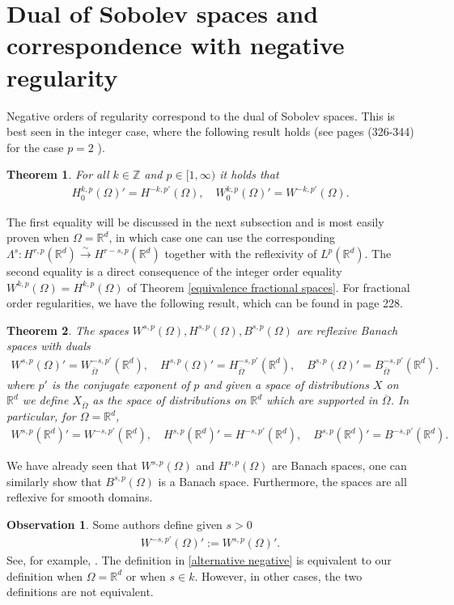 \documentclass[
    a4paper,
    DIV=14,
    abstract=true,
    numbers=noenddot
]
{scrartcl}
\newtheorem{theorem}{Theorem}[section]
\theoremstyle{definition}
\newtheorem{observation}{Observation}
\newcommand{\iso}{\xrightarrow{\sim}}
\newcommand{\R}{\mathbb{R}}
\begin{document}
\section{Dual of Sobolev spaces and correspondence with negative regularity}
Negative orders of regularity correspond to the dual of Sobolev spaces. This is best seen in the integer case, where the following result holds (see \cite{evans2022partial} pages (326-344) for the case $p=2$ ).
\begin{theorem}\label{dual of integer sobolev}
    For all $k \in \mathbb{Z}$ and $p \in [1,\infty)$ it holds that
    \begin{align*}
        H^{k,p}_0(\Omega )' = H^{-k,p'}(\Omega ), \quad W^{k,p}_0(\Omega )' = W^{-k,p'}(\Omega ).
    \end{align*}
\end{theorem}
The first equality will be discussed in the next subsection and is most easily proven when $\Omega =\R^d$, in which case one can use the corresponding $\Lambda ^s: H^{r,p}(\R^d )\iso H^{r-s,p}(\R^d )$ together with the reflexivity of $L^p(\R^d )$. The second equality is a direct consequence of the integer order equality $W^{k,p}(\Omega )=H^{k,p}(\Omega )$ of Theorem \ref{equivalence fractional spaces}. For fractional order regularities, we have the following result, which can be found in \cite{agranovich2015sobolev} page 228.
\begin{theorem}
    The spaces $W^{s,p}(\Omega ),H^{s,p}(\Omega ),B^{s,p}(\Omega )$ are reflexive Banach spaces with duals
    \begin{align*}
        W^{s,p}(\Omega )'=	W^{-s,p'}_{\overline{\Omega } }(\R^d ), \quad H^{s,p}(\Omega )' = H^{-s,p'}_{\overline{\Omega } }(\R^d ), \quad B^{s,p}(\Omega )' = B^{-s,p'}_{\overline{\Omega } }(\R^d ).
    \end{align*}
    where $p'$ is the conjugate exponent of $p$ and given a space of distributions $X$ on $\R^d$ we define $X_{\overline{\Omega }}$ as the space of distributions on $\R^d$ which are supported in $\overline{\Omega }$. In particular, for $\Omega =\R^d$,
    \begin{align*}
        W^{s,p}(\R^d )'=	W^{-s,p'}(\R^d ), \quad H^{s,p}(\R^d )' = H^{-s,p'}(\R^d ), \quad B^{s,p}(\R^d )' = B^{-s,p'}(\R^d ).
    \end{align*}
\end{theorem}
We have already seen that $W^{s,p}(\Omega )$ and $H^{s,p}(\Omega )$ are Banach spaces, one can similarly show that $B^{s,p}(\Omega )$ is a Banach space. Furthermore, the spaces are all reflexive for smooth domains.
\begin{observation}
    Some authors define given $s>0$
    \begin{align}\label{alternative negative}
        W^{-s,p'}(\Omega )':=	W^{s,p}(\Omega )'.
    \end{align}
    See, for example, \cite{biccari2018local}. The definition in \eqref{alternative negative} is equivalent to our definition when $\Omega = \R^d$ or when $s \in k$. However, in other cases, the two definitions are not equivalent.
\end{observation}
\end{document}
